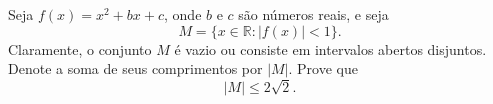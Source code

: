Seja \(f(x) = x^2 + bx + c\), onde \(b\) e \(c\) são números reais, e seja 
\[M = \{x \in \mathbb{R} : |f(x)| < 1\}.\]
Claramente, o conjunto \(M\) é vazio ou consiste em intervalos abertos disjuntos. 
Denote a soma de seus comprimentos por \(|M|\).
Prove que 
\[
|M| \le 2\sqrt{2}.
\]
